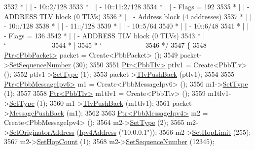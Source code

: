 \begin{DoxyCode}
3532 \textcolor{comment}{         * |    |     - 10::2/128}
3533 \textcolor{comment}{         * |    |     - 10::11:2/128}
3534 \textcolor{comment}{         * |    |     - Flags = 192}
3535 \textcolor{comment}{         * |    | - ADDRESS TLV block (0 TLVs)}
3536 \textcolor{comment}{         * |    | - Address block (4 addresses)}
3537 \textcolor{comment}{         * |    |     - 10::/128}
3538 \textcolor{comment}{         * |    |     - 11::/128}
3539 \textcolor{comment}{         * |    |     - 10::5/64}
3540 \textcolor{comment}{         * |    |     - 10::6/48}
3541 \textcolor{comment}{         * |    |     - Flags = 136}
3542 \textcolor{comment}{         * |    | - ADDRESS TLV block (0 TLVs)}
3543 \textcolor{comment}{         * |    `-------------------}
3544 \textcolor{comment}{         * |}
3545 \textcolor{comment}{         * `------------------}
3546 \textcolor{comment}{   */}
3547   \{
3548     \hyperlink{classns3_1_1Ptr}{Ptr<PbbPacket>} packet = Create<PbbPacket> ();
3549     packet->\hyperlink{classns3_1_1PbbPacket_a7d6a1602be86109760d0f26ff9bbbb8e}{SetSequenceNumber} (30);
3550 
3551     \hyperlink{classns3_1_1Ptr}{Ptr<PbbTlv>} ptlv1 = Create<PbbTlv> ();
3552     ptlv1->\hyperlink{classns3_1_1PbbTlv_a90a0452018ed364ac37c3ad116dd718b}{SetType} (1);
3553     packet->\hyperlink{classns3_1_1PbbPacket_a34935793e729a106c176db99c969cb42}{TlvPushBack} (ptlv1);
3554 
3555     \hyperlink{classns3_1_1Ptr}{Ptr<PbbMessageIpv6>} m1 = Create<PbbMessageIpv6> ();
3556     m1->\hyperlink{classns3_1_1PbbMessage_a4b3d1eaabd3e7412a46ac79bf3360dac}{SetType} (1);
3557 
3558     \hyperlink{classns3_1_1Ptr}{Ptr<PbbTlv>} m1tlv1 = Create<PbbTlv> ();
3559     m1tlv1->\hyperlink{classns3_1_1PbbTlv_a90a0452018ed364ac37c3ad116dd718b}{SetType} (1);
3560     m1->\hyperlink{classns3_1_1PbbMessage_aac70b2672f79765cf5cc5b6666018165}{TlvPushBack} (m1tlv1);
3561     packet->\hyperlink{classns3_1_1PbbPacket_a4a3170001ef758d9c9c4375b8f089826}{MessagePushBack} (m1);
3562 
3563     \hyperlink{classns3_1_1Ptr}{Ptr<PbbMessageIpv4>} m2 = Create<PbbMessageIpv4> ();
3564     m2->\hyperlink{classns3_1_1PbbMessage_a4b3d1eaabd3e7412a46ac79bf3360dac}{SetType} (2);
3565     m2->\hyperlink{classns3_1_1PbbMessage_a52ac135a2bec53db5e8f46b8b8a25e7c}{SetOriginatorAddress} (\hyperlink{classns3_1_1Ipv4Address}{Ipv4Address} (\textcolor{stringliteral}{"10.0.0.1"}));
3566     m2->\hyperlink{classns3_1_1PbbMessage_a532a7e5e135f7491f8a84ab1dfadd28f}{SetHopLimit} (255);
3567     m2->\hyperlink{classns3_1_1PbbMessage_a882ec7e2e9a9dff6297152c196d54ce4}{SetHopCount} (1);
3568     m2->\hyperlink{classns3_1_1PbbMessage_a8c24696ac67507afa03c9750daccc47d}{SetSequenceNumber} (12345);

\end{DoxyCode}
